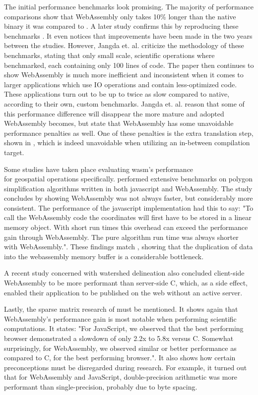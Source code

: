 The initial performance benchmarks look promising. The majority of performance comparisons show that WebAssembly only takes 10\% longer than the native binary it was compared to \citet{haas_bringing_2017}. A later study confirms this by reproducing these benchmarks \citep{jangda_not_2019}. It even notices that improvements have been made in the two years between the studies. However, Jangda et. al. criticize the methodology of these benchmarks, stating that only small scale, scientific operations where benchmarked, each containing only 100 lines of code. The paper then continues to show WebAssembly is much more inefficient and inconsistent when it comes to larger applications which use IO operations and contain less-optimized code. These applications turn out to be up to twice as slow compared to native, according to their own, custom benchmarks. 
Jangda et. al. reason that some of this performance difference will disappear the more mature and adopted WebAssembly becomes, but state that WebAssembly has some unavoidable performance penalties as well. 
One of these penalties is the extra translation step, shown in , which is indeed unavoidable when utilizing an in-between compilation target. 

Some studies have taken place evaluating \ac{wasm}'s performance  \\ for geospatial operations specifically. 
\citet{melch_performance_2019} performed extensive benchmarks on polygon simplification algorithms written in both javascript and WebAssembly. 
The study concludes by showing WebAssembly was not always faster, but considerably more consistent. 
The performance of the javascript implementation 
\citet{melch_performance_2019} had this to say: "To call the WebAssembly code the coordinates will first have to be stored in a linear memory object. 
With short run times this overhead can exceed the performance gain through WebAssembly. 
The pure algorithm run time was always shorter with WebAssembly.". 
These findings match \citet{jangda_not_2019}, showing that the duplication of data into the webassembly memory buffer is a considerable bottleneck.

A recent study concerned with watershed delineation \citep{sit_optimized_2019} also concluded client-side WebAssembly to be more performant than server-side C, which, as a side effect, enabled their application to be published on the web without an active server. 

Lastly, the sparse matrix research of \citet{sandhu_sparse_2018} must be mentioned. It shows again that WebAssembly's performance gain is most notable when performing scientific computations. It states: "For JavaScript, we observed that the best performing browser demonstrated a slowdown of only 2.2x to 5.8x versus C. Somewhat surprisingly, for WebAssembly, we observed similar or better performance as compared to C, for the best performing browser.". It also shows how certain preconceptions must be disregarded during research. For example, it turned out that for WebAssembly and JavaScript, double-precision arithmetic was more performant than single-precision, probably due to byte spacing.


